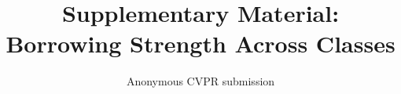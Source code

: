 \documentclass[10pt,twocolumn,letterpaper]{article}
\title{Supplementary Material: Borrowing Strength Across Classes}
\author{Anonymous CVPR submission}
\begin{document}
\maketitle

{\small}
\end{document}
